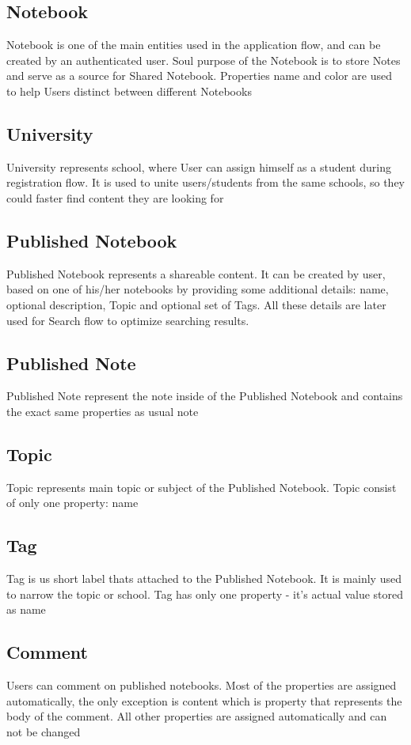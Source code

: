 \documentclass[thesis=B,english]{FITthesis}[2012/10/20]
\begin{document}
\subsection{Notebook}
	Notebook is one of the main entities used in the application flow, and  can be created by an authenticated user. Soul purpose of the Notebook is to store Notes and serve as a source for Shared Notebook. Properties name and color are used to help Users distinct between different Notebooks
	
	
\subsection{University}
University represents school, where User can assign himself as a student during registration flow. It is used to unite users/students from the same schools, so they could faster find content they are looking for

\subsection{Published Notebook}
Published Notebook represents a shareable content. It can be created by user, based on one of his/her notebooks by providing some additional details:
name, optional description,  Topic and optional set of Tags. All these details are later used for Search flow to optimize searching results.

\subsection{Published Note}
Published Note represent the note inside of the Published Notebook and  contains the exact same properties as usual note

\subsection{Topic}
Topic represents main topic or subject of the Published Notebook. Topic consist of only one property: name
\subsection{Tag}
Tag is us short label thats attached to the Published Notebook. It is mainly  used to narrow the topic or school. Tag has only one property - it's actual value stored as name

\subsection{Comment}
Users can comment on published notebooks. Most of the properties are assigned automatically, the only exception is content which is property that represents the body of the comment. All other properties are assigned automatically and can not be changed
\end{document}
